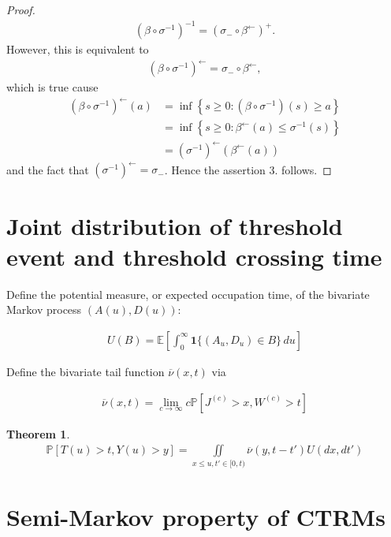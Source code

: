 \documentclass[12pt, a4paper]{article}
\newtheorem{theorem}[equation]{Theorem}
\newcommand{\ex}{\mathbb {E}}
\newcommand{\pr}{\mathbb {P}}
\newcommand{\1}{\mathbf 1}
\begin{document}
\begin{proof}
\begin{align*}
(\beta \circ \sigma^{-1})^{-1}=(\sigma_{-} \circ \beta^{\leftarrow})^{+}.
\end{align*}
However, this is equivalent to
\begin{align*}
(\beta \circ \sigma^{-1})^{\leftarrow} = \sigma_{-} \circ \beta^{\leftarrow},
\end{align*}
which is true cause 
\begin{align*}
(\beta \circ \sigma^{-1})^{\leftarrow}(a)&=\inf \left\{s \geq 0: (\beta \circ \sigma^{-1})(s) \geq a\right\}\\
&=\inf \left\{ s \geq 0: \beta^{\leftarrow}(a) \leq \sigma^{-1}(s) \right\}\\
&=(\sigma^{-1})^{\leftarrow}(\beta^{\leftarrow}(a))
\end{align*}
and the fact that $(\sigma^{-1})^{\leftarrow}=\sigma_{-}$. Hence the assertion 3. follows.

\end{proof}





\section{Joint distribution of threshold event and threshold crossing time}

Define the potential measure, or expected occupation time, of the bivariate 
Markov process $(A(u),D(u))$:

\begin{align*}
U(B) = \ex \left[ \int_0^\infty \mathbf 1\{ (A_u, D_u) \in B\}\,du \right]
\end{align*}

Define the bivariate tail function $\overline \nu(x,t)$ via 

\begin{align}
\overline \nu(x,t) = \lim_{c \to \infty} c \pr [J^{(c)} > x, W^{(c)} > t]
\end{align}


\begin{theorem}
\begin{align}
\pr [T(u) > t, Y(u) > y]
= \iint\limits_{x \le u, t' \in [0,t)} \overline \nu(y, t - t') U(dx, dt')
\end{align}
\end{theorem}


\section{Semi-Markov property of CTRMs}
\label{sec:records}
\end{document}
